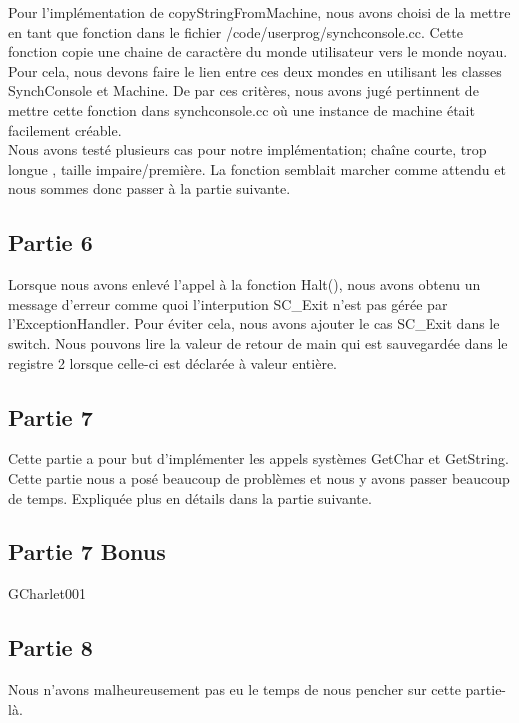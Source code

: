 \documentclass[a4paper]{article}
\begin{document}
Pour l'implémentation de copyStringFromMachine, nous avons choisi de la mettre
en tant que fonction dans le fichier /code/userprog/synchconsole.cc. Cette fonction
copie une chaine de caractère du monde utilisateur vers le monde noyau. Pour cela,
nous devons faire le lien entre ces deux mondes en utilisant les classes SynchConsole
et Machine. De par ces critères, nous avons jugé pertinnent de mettre cette fonction
dans synchconsole.cc où une instance de machine était facilement créable. \\

Nous avons testé plusieurs cas pour notre implémentation; chaîne courte, trop longue
, taille impaire/première. La fonction semblait marcher comme attendu et nous sommes
donc passer à la partie suivante.

\subsection{Partie 6}
Lorsque nous avons enlevé l'appel à la fonction Halt(), nous avons obtenu
un message d'erreur comme quoi l'interpution SC\_Exit n'est pas gérée par
l'ExceptionHandler. Pour éviter cela, nous avons ajouter le cas SC\_Exit dans le
switch. Nous pouvons lire la valeur de retour de main qui est sauvegardée dans
le registre 2 lorsque celle-ci est déclarée à valeur entière.

\subsection{Partie 7}
Cette partie a pour but d'implémenter les appels systèmes GetChar et GetString.
Cette partie nous a posé beaucoup de problèmes et nous y avons passer beaucoup de
temps. Expliquée plus en détails dans la partie suivante.

\subsection{Partie 7 Bonus}

GCharlet001

\subsection{Partie 8}
Nous n'avons malheureusement pas eu le temps de nous pencher sur cette partie-là.

\end{document}
